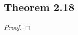 \documentclass[../../main.tex]{subfiles}
\begin{document}
\subsection{Theorem 2.18}
\begin{wts}

\end{wts}
\begin{proof}

\end{proof}
\end{document}
